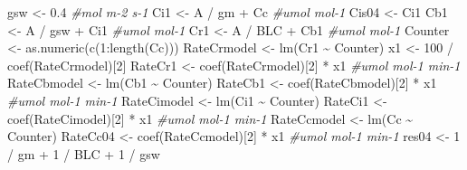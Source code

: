 \documentclass[
]{krantz}
\makeatletter
\newenvironment{Shaded}{\begin{snugshade}}{\end{snugshade}}
\newcommand{\CommentTok}[1]{\textcolor[rgb]{0.56,0.35,0.01}{\textit{#1}}}
\newcommand{\DecValTok}[1]{\textcolor[rgb]{0.00,0.00,0.81}{#1}}
\newcommand{\FloatTok}[1]{\textcolor[rgb]{0.00,0.00,0.81}{#1}}
\newcommand{\FunctionTok}[1]{\textcolor[rgb]{0.00,0.00,0.00}{#1}}
\newcommand{\NormalTok}[1]{#1}
\newcommand{\OtherTok}[1]{\textcolor[rgb]{0.56,0.35,0.01}{#1}}
\newcommand{\SpecialCharTok}[1]{\textcolor[rgb]{0.00,0.00,0.00}{#1}}
\newenvironment{kframe}{%
\medskip{}
\setlength{\fboxsep}{.8em}
 \def\at@end@of@kframe{}%
 \ifinner\ifhmode%
  \def\at@end@of@kframe{\end{minipage}}%
  \begin{minipage}{\columnwidth}%
 \fi\fi%
 \def\FrameCommand##1{\hskip\@totalleftmargin \hskip-\fboxsep
 \colorbox{shadecolor}{##1}\hskip-\fboxsep
     \hskip-\linewidth \hskip-\@totalleftmargin \hskip\columnwidth}%
 \MakeFramed {\advance\hsize-\width
   \@totalleftmargin\z@ \linewidth\hsize
   \@setminipage}}%
 {\par\unskip\endMakeFramed%
 \at@end@of@kframe}
\renewenvironment{Shaded}{\begin{kframe}}{\end{kframe}}
\makeatother
\begin{document}
\begin{Shaded}
\begin{Highlighting}[]
\NormalTok{gsw }\OtherTok{\textless{}{-}} \FloatTok{0.4} \CommentTok{\#mol m{-}2 s{-}1}
\NormalTok{Ci1 }\OtherTok{\textless{}{-}}\NormalTok{ A }\SpecialCharTok{/}\NormalTok{ gm }\SpecialCharTok{+}\NormalTok{ Cc }\CommentTok{\#umol mol{-}1}
\NormalTok{Cis04 }\OtherTok{\textless{}{-}}\NormalTok{ Ci1}
\NormalTok{Cb1 }\OtherTok{\textless{}{-}}\NormalTok{ A }\SpecialCharTok{/}\NormalTok{ gsw }\SpecialCharTok{+}\NormalTok{ Ci1 }\CommentTok{\#umol mol{-}1}
\NormalTok{Cr1 }\OtherTok{\textless{}{-}}\NormalTok{ A }\SpecialCharTok{/}\NormalTok{ BLC }\SpecialCharTok{+}\NormalTok{ Cb1 }\CommentTok{\#umol mol{-}1}
\NormalTok{Counter }\OtherTok{\textless{}{-}} \FunctionTok{as.numeric}\NormalTok{(}\FunctionTok{c}\NormalTok{(}\DecValTok{1}\SpecialCharTok{:}\FunctionTok{length}\NormalTok{(Cc)))}
\NormalTok{RateCrmodel }\OtherTok{\textless{}{-}} \FunctionTok{lm}\NormalTok{(Cr1 }\SpecialCharTok{\textasciitilde{}}\NormalTok{ Counter)}
\NormalTok{x1 }\OtherTok{\textless{}{-}} \DecValTok{100} \SpecialCharTok{/} \FunctionTok{coef}\NormalTok{(RateCrmodel)[}\DecValTok{2}\NormalTok{] }
\NormalTok{RateCr1 }\OtherTok{\textless{}{-}} \FunctionTok{coef}\NormalTok{(RateCrmodel)[}\DecValTok{2}\NormalTok{] }\SpecialCharTok{*}\NormalTok{ x1 }\CommentTok{\#umol mol{-}1 min{-}1}
\NormalTok{RateCbmodel }\OtherTok{\textless{}{-}} \FunctionTok{lm}\NormalTok{(Cb1 }\SpecialCharTok{\textasciitilde{}}\NormalTok{ Counter)}
\NormalTok{RateCb1 }\OtherTok{\textless{}{-}} \FunctionTok{coef}\NormalTok{(RateCbmodel)[}\DecValTok{2}\NormalTok{] }\SpecialCharTok{*}\NormalTok{ x1 }\CommentTok{\#umol mol{-}1 min{-}1}
\NormalTok{RateCimodel }\OtherTok{\textless{}{-}} \FunctionTok{lm}\NormalTok{(Ci1 }\SpecialCharTok{\textasciitilde{}}\NormalTok{ Counter)}
\NormalTok{RateCi1 }\OtherTok{\textless{}{-}} \FunctionTok{coef}\NormalTok{(RateCimodel)[}\DecValTok{2}\NormalTok{] }\SpecialCharTok{*}\NormalTok{ x1 }\CommentTok{\#umol mol{-}1 min{-}1}
\NormalTok{RateCcmodel }\OtherTok{\textless{}{-}} \FunctionTok{lm}\NormalTok{(Cc }\SpecialCharTok{\textasciitilde{}}\NormalTok{ Counter)}
\NormalTok{RateCc04 }\OtherTok{\textless{}{-}} \FunctionTok{coef}\NormalTok{(RateCcmodel)[}\DecValTok{2}\NormalTok{] }\SpecialCharTok{*}\NormalTok{ x1 }\CommentTok{\#umol mol{-}1 min{-}1}
\NormalTok{res04 }\OtherTok{\textless{}{-}} \DecValTok{1} \SpecialCharTok{/}\NormalTok{ gm }\SpecialCharTok{+} \DecValTok{1} \SpecialCharTok{/}\NormalTok{ BLC }\SpecialCharTok{+} \DecValTok{1} \SpecialCharTok{/}\NormalTok{ gsw}


\end{Highlighting}
\end{Shaded}
\end{document}
